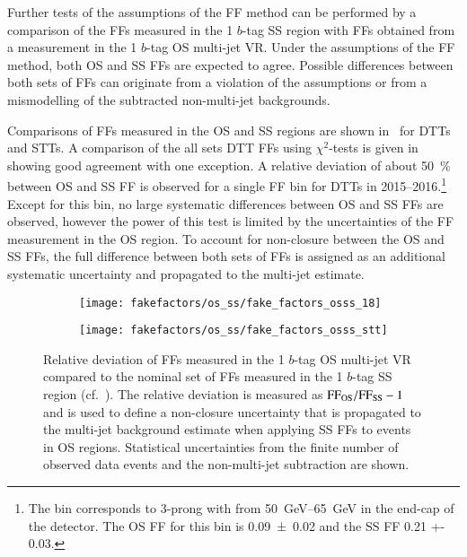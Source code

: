Further tests of the assumptions of the
FF method can be performed by a comparison of the FFs measured in the 1 $b$-tag
SS region with FFs obtained from a measurement in the 1 $b$-tag OS multi-jet
VR. Under the assumptions of the FF method, both OS and SS FFs are expected to
agree. Possible differences between both sets of FFs can originate from a
violation of the assumptions or from a mismodelling of the subtracted
non-multi-jet backgrounds.

Comparisons of FFs measured in the OS and SS regions are shown
in~ for DTTs and STTs. A comparison of the all sets
DTT FFs using $\chi^2$-tests is given in~
showing good agreement with one exception. %
A relative deviation of about \SI{50}{\percent} between OS and SS FF is observed
for a single FF bin for DTTs in 2015--2016.\footnote{The bin corresponds to
  3-prong \tauhadvis with \pT from \SIrange{50}{65}{\GeV} in the end-cap of the
  detector. The OS FF for this bin is \num{0.09 +- 0.02} and the SS FF \num{0.21
    +- 0.03}.}  Except for this bin, no large systematic differences between OS
and SS FFs are observed, however the power of this test is limited by the
uncertainties of the FF measurement in the OS region. To account for non-closure
between the OS and SS FFs, the full difference between both sets of FFs is
assigned as an additional systematic uncertainty and propagated to the multi-jet
estimate.


\begin{figure}[htbp]
  \centering

  \begin{subfigure}[t]{0.48\textwidth}
    \texttt{[image: fakefactors/os\_ss/fake\_factors\_osss\_18]}
    \label{fig:fake_factor_OSSS_dtt}
  \end{subfigure}\hfill%
  \begin{subfigure}[t]{0.48\textwidth}
    \texttt{[image: fakefactors/os\_ss/fake\_factors\_osss\_stt]}
    \label{fig:fake_factor_OSSS_stt}
  \end{subfigure}

  \caption{Relative deviation of FFs measured in the 1 $b$-tag OS multi-jet VR
    compared to the nominal set of FFs measured in the 1 $b$-tag SS region (cf.\
    ). The relative deviation
    is measured as $\text{FF}_\text{OS} / \text{FF}_\text{SS} - 1$ and is used to define a
    non-closure uncertainty that is propagated to the multi-jet background
    estimate when applying SS FFs to events in OS regions. Statistical
    uncertainties from the finite number of observed data events and the
    non-multi-jet subtraction are shown.}%
  \label{fig:fake_factor_OSSS}
\end{figure}


